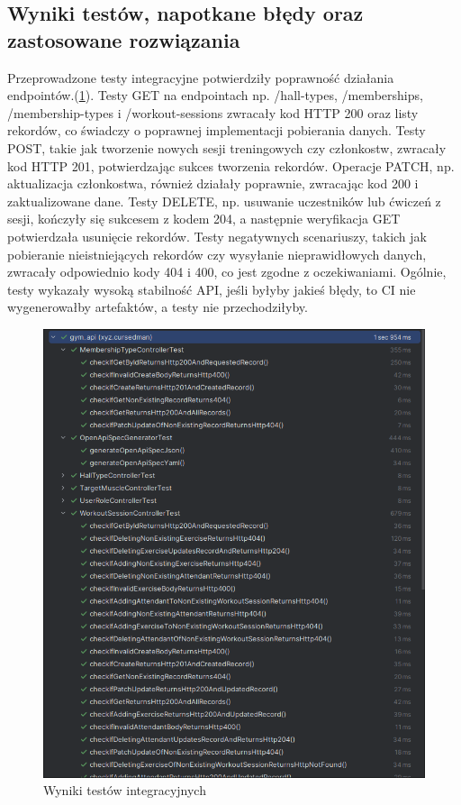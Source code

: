 \documentclass[../../spr.tex]{subfiles}
\begin{document}
\subsection{Wyniki testów, napotkane błędy oraz zastosowane rozwiązania}
Przeprowadzone testy integracyjne
potwierdziły poprawność działania endpointów.(\cref{fig:test-results}).
Testy GET na endpointach np. /hall-types, /memberships, /membership-types i /workout-sessions
zwracały kod HTTP 200 oraz listy rekordów, co świadczy o poprawnej implementacji pobierania danych.
Testy POST, takie jak tworzenie nowych sesji treningowych czy członkostw,
zwracały kod HTTP 201, potwierdzając sukces tworzenia rekordów.
Operacje PATCH, np. aktualizacja członkostwa, również działały poprawnie,
zwracając kod 200 i zaktualizowane dane. Testy DELETE, np. usuwanie uczestników
lub ćwiczeń z sesji, kończyły się sukcesem z kodem 204, a następnie weryfikacja GET
potwierdzała usunięcie rekordów. Testy negatywnych scenariuszy,
takich jak pobieranie nieistniejących rekordów czy wysyłanie nieprawidłowych danych,
zwracały odpowiednio kody 404 i 400, co jest zgodne z oczekiwaniami.
Ogólnie, testy wykazały wysoką stabilność API, jeśli byłyby jakieś błędy,
to CI nie wygenerowałby artefaktów, a testy nie przechodziłyby.
\begin{figure}
  \centering
  \includegraphics[width=\textwidth]{tests.png}
  \caption{Wyniki testów integracyjnych}
  \label{fig:test-results}
\end{figure}
\end{document}
